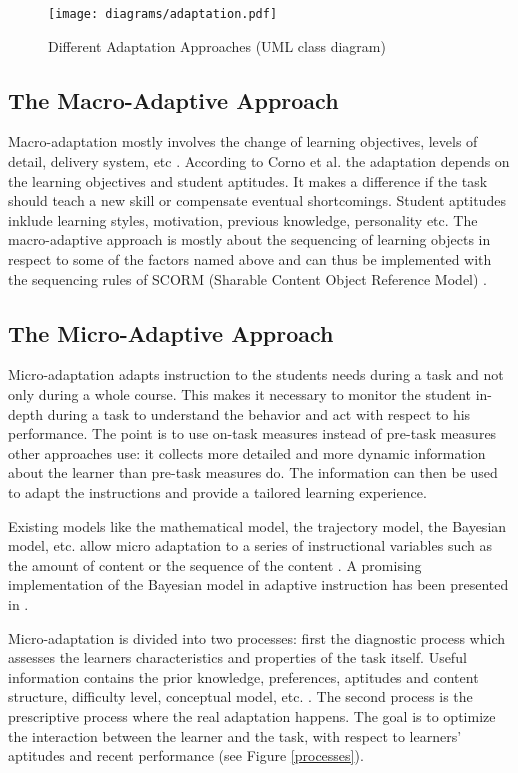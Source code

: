 \begin{figure}
    \centering
    \texttt{[image: diagrams/adaptation.pdf]}
    \caption[Different Adaptation Approaches (UML class diagram)]
    {Different Adaptation Approaches (UML class diagram)}
\end{figure}

\subsection{The Macro-Adaptive Approach}
Macro-adaptation mostly involves the change of learning objectives, levels of detail, delivery
system, etc \cite{Modritscher2004}. According to Corno et al. \cite{Corno1986}
the adaptation depends on the learning objectives and student aptitudes. It
makes a difference if the task should teach a new skill or compensate eventual
shortcomings. Student aptitudes inklude learning styles, motivation, previous
knowledge, personality etc. The macro-adaptive approach is mostly about the
sequencing of learning objects in respect to some of the factors named above
and can thus be implemented with the sequencing rules of SCORM (Sharable
Content Object Reference Model) \cite{Modritscher2006a}.

\subsection{The Micro-Adaptive Approach}
Micro-adaptation adapts instruction to the students needs during a task and
not only during a whole course. This makes it necessary to monitor the student
in-depth during a task to understand the behavior and act with respect to his
performance. The point is to use on-task measures instead of
pre-task measures other approaches use: it collects more detailed and more
dynamic information about the learner than pre-task measures do. The
information can then be used to adapt the instructions and provide a tailored
learning experience.

Existing models like the mathematical model, the trajectory model, the
Bayesian model, etc. allow micro adaptation to a series of instructional
variables such as the amount of content or the sequence of the content
\cite{Modritscher2004}. A promising implementation of the Bayesian model in
adaptive instruction has been presented in \cite{Rothen1978a}.

Micro-adaptation is divided into two processes: first the diagnostic process
which assesses the learners characteristics and properties of the task itself.
Useful information contains the prior knowledge, preferences, aptitudes
and content structure, difficulty level, conceptual model, etc.
\cite{Modritscher2004}. The second process is the prescriptive process
where the real adaptation happens. The goal is to optimize the interaction
between the learner and the task, with respect to learners' aptitudes and recent
performance (see Figure \ref{processes}).

